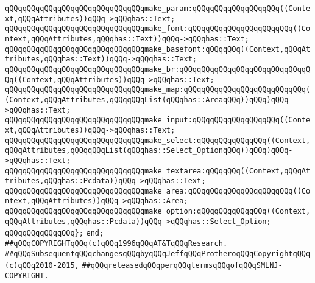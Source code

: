 \verb|qQQqqQQqqQQqqQQqqQQqqQQqqQQqqQQqmake_param:qQQqqQQqqQQqqQQqqQQq((Context,qQQqAttributes))qQQq->qQQqhas::Text;|\newline
\verb|qQQqqQQqqQQqqQQqqQQqqQQqqQQqqQQqmake_font:qQQqqQQqqQQqqQQqqQQqqQQq((Context,qQQqAttributes,qQQqhas::Text))qQQq->qQQqhas::Text;|\newline
\verb|qQQqqQQqqQQqqQQqqQQqqQQqqQQqqQQqmake_basefont:qQQqqQQq((Context,qQQqAttributes,qQQqhas::Text))qQQq->qQQqhas::Text;|\newline
\verb|qQQqqQQqqQQqqQQqqQQqqQQqqQQqqQQqmake_br:qQQqqQQqqQQqqQQqqQQqqQQqqQQqqQQq((Context,qQQqAttributes))qQQq->qQQqhas::Text;|\newline
\verb|qQQqqQQqqQQqqQQqqQQqqQQqqQQqqQQqmake_map:qQQqqQQqqQQqqQQqqQQqqQQqqQQq((Context,qQQqAttributes,qQQqqQQqList(qQQqhas::AreaqQQq))qQQq)qQQq->qQQqhas::Text;|\newline
\verb|qQQqqQQqqQQqqQQqqQQqqQQqqQQqqQQqmake_input:qQQqqQQqqQQqqQQqqQQq((Context,qQQqAttributes))qQQq->qQQqhas::Text;|\newline
\verb|qQQqqQQqqQQqqQQqqQQqqQQqqQQqqQQqmake_select:qQQqqQQqqQQqqQQq((Context,qQQqAttributes,qQQqqQQqList(qQQqhas::Select_OptionqQQq))qQQq)qQQq->qQQqhas::Text;|\newline
\verb|qQQqqQQqqQQqqQQqqQQqqQQqqQQqqQQqmake_textarea:qQQqqQQq((Context,qQQqAttributes,qQQqhas::Pcdata))qQQq->qQQqhas::Text;|\newline
\verb|qQQqqQQqqQQqqQQqqQQqqQQqqQQqqQQqmake_area:qQQqqQQqqQQqqQQqqQQqqQQq((Context,qQQqAttributes))qQQq->qQQqhas::Area;|\newline
\verb|qQQqqQQqqQQqqQQqqQQqqQQqqQQqqQQqmake_option:qQQqqQQqqQQqqQQq((Context,qQQqAttributes,qQQqhas::Pcdata))qQQq->qQQqhas::Select_Option;|\newline
\newline
\verb|qQQqqQQqqQQqqQQq};|\newline
\verb|end;|\newline
\newline
\newline
\verb|##qQQqCOPYRIGHTqQQq(c)qQQq1996qQQqAT&TqQQqResearch.|\newline
\verb|##qQQqSubsequentqQQqchangesqQQqbyqQQqJeffqQQqProtheroqQQqCopyrightqQQq(c)qQQq2010-2015,|\newline
\verb|##qQQqreleasedqQQqperqQQqtermsqQQqofqQQqSMLNJ-COPYRIGHT.|\newline

